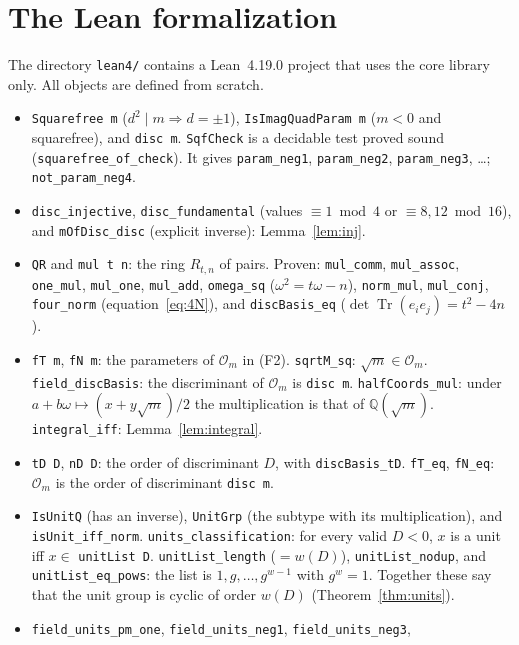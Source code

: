 \documentclass[11pt]{article}
\theoremstyle{definition}
\theoremstyle{remark}
\newcommand{\Q}{\mathbb{Q}}
\newcommand{\OO}{\mathcal{O}}
\newcommand{\Tr}{\operatorname{Tr}}
\begin{document}
\section{The Lean formalization}
The directory \texttt{lean4/} contains a Lean~4.19.0 project that uses the core library only.
All objects are defined from scratch.
\begin{itemize}
\item \texttt{Squarefree m} ($d^2\mid m\Rightarrow d=\pm1$), \texttt{IsImagQuadParam m}
($m<0$ and squarefree), and \texttt{disc m}. \texttt{SqfCheck} is a decidable test proved sound
(\texttt{squarefree\_of\_check}). It gives \texttt{param\_neg1}, \texttt{param\_neg2},
\texttt{param\_neg3}, \dots; \texttt{not\_param\_neg4}.
\item \texttt{disc\_injective}, \texttt{disc\_fundamental} (values $\equiv1\bmod4$ or
$\equiv8,12\bmod16$), and \texttt{mOfDisc\_disc} (explicit inverse): Lemma~\ref{lem:inj}.
\item \texttt{QR} and \texttt{mul t n}: the ring $R_{t,n}$ of pairs. Proven:
\texttt{mul\_comm}, \texttt{mul\_assoc}, \texttt{one\_mul}, \texttt{mul\_one},
\texttt{mul\_add}, \texttt{omega\_sq} ($\omega^2=t\omega-n$), \texttt{norm\_mul},
\texttt{mul\_conj}, \texttt{four\_norm} (equation~\eqref{eq:4N}), and \texttt{discBasis\_eq}
($\det\Tr(e_ie_j)=t^2-4n$).
\item \texttt{fT m}, \texttt{fN m}: the parameters of $\OO_m$ in (F2). \texttt{sqrtM\_sq}:
$\sqrt m\in\OO_m$. \texttt{field\_discBasis}: the discriminant of $\OO_m$ is \texttt{disc m}.
\texttt{halfCoords\_mul}: under $a+b\omega\mapsto(x+y\sqrt m)/2$ the multiplication is that of
$\Q(\sqrt m)$. \texttt{integral\_iff}: Lemma~\ref{lem:integral}.
\item \texttt{tD D}, \texttt{nD D}: the order of discriminant $D$, with
\texttt{discBasis\_tD}. \texttt{fT\_eq}, \texttt{fN\_eq}: $\OO_m$ is the order of discriminant
\texttt{disc m}.
\item \texttt{IsUnitQ} (has an inverse), \texttt{UnitGrp} (the subtype with its
multiplication), and \texttt{isUnit\_iff\_norm}.
\texttt{units\_classification}: for every valid $D<0$, $x$ is a unit iff
$x\in$ \texttt{unitList D}. \texttt{unitList\_length} ($=w(D)$), \texttt{unitList\_nodup}, and
\texttt{unitList\_eq\_pows}: the list is $1,g,\dots,g^{w-1}$ with $g^{w}=1$. Together these say
that the unit group is cyclic of order $w(D)$ (Theorem~\ref{thm:units}).
\item \texttt{field\_units\_pm\_one}, \texttt{field\_units\_neg1}, \texttt{field\_units\_neg3},

\end{itemize}
\end{document}
